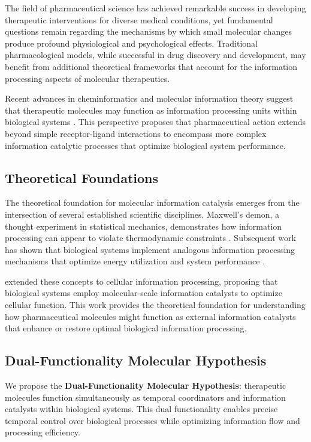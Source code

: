 \documentclass[12pt,a4paper]{article}
\begin{document}
The field of pharmaceutical science has achieved remarkable success in developing therapeutic interventions for diverse medical conditions, yet fundamental questions remain regarding the mechanisms by which small molecular changes produce profound physiological and psychological effects. Traditional pharmacological models, while successful in drug discovery and development, may benefit from additional theoretical frameworks that account for the information processing aspects of molecular therapeutics.

Recent advances in cheminformatics and molecular information theory suggest that therapeutic molecules may function as information processing units within biological systems \citep{mizraji2007biological, sterling2015principles}. This perspective proposes that pharmaceutical action extends beyond simple receptor-ligand interactions to encompass more complex information catalytic processes that optimize biological system performance.

\subsection{Theoretical Foundations}

The theoretical foundation for molecular information catalysis emerges from the intersection of several established scientific disciplines. Maxwell's demon, a thought experiment in statistical mechanics, demonstrates how information processing can appear to violate thermodynamic constraints \citep{bennett1982thermodynamics}. Subsequent work has shown that biological systems implement analogous information processing mechanisms that optimize energy utilization and system performance \citep{landauer1961irreversibility}.

\citet{mizraji2007biological} extended these concepts to cellular information processing, proposing that biological systems employ molecular-scale information catalysts to optimize cellular function. This work provides the theoretical foundation for understanding how pharmaceutical molecules might function as external information catalysts that enhance or restore optimal biological information processing.

\subsection{Dual-Functionality Molecular Hypothesis}

We propose the \textbf{Dual-Functionality Molecular Hypothesis}: therapeutic molecules function simultaneously as temporal coordinators and information catalysts within biological systems. This dual functionality enables precise temporal control over biological processes while optimizing information flow and processing efficiency.
\end{document}
